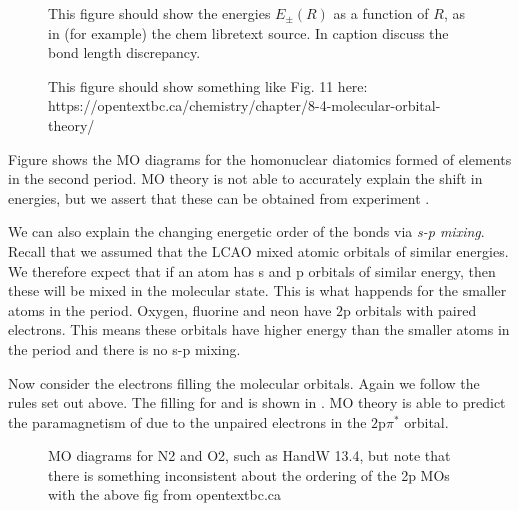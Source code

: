 
\begin{figure}
  \caption{This figure should show the energies $E_\pm(R)$ as a function of $R$,
  as in (for example) the chem libretext source. In caption discuss the bond
  length discrepancy.}
  \label{diaspec:fig:Henergies}
\end{figure}

\begin{figure}
  \caption{This figure should show something like Fig. 11 here:
  https://opentextbc.ca/chemistry/chapter/8-4-molecular-orbital-theory/
  }
  \label{diaspec:fig:2ndperiod}
\end{figure}

Figure  shows the MO diagrams for the
homonuclear diatomics formed of elements in the second period. MO theory is not
able to accurately explain the shift in energies, but we assert that these can
be obtained from experiment .

We can also explain the changing energetic order of the bonds via \emph{s-p
mixing}. Recall that we assumed that the LCAO mixed atomic orbitals of similar
energies. We therefore expect that if an atom has s and p orbitals of similar
energy, then these will be mixed in the molecular state. This is what happends
for the smaller atoms in the period. Oxygen, fluorine and neon have $\text{2p}$
orbitals with paired electrons. This means these orbitals have higher energy
than the smaller atoms in the period and there is no s-p mixing.

Now consider the electrons filling the molecular orbitals. Again we follow the
rules set out above. The filling for  and  is shown in
. MO theory is able to predict the paramagnetism of
 due to the unpaired electrons in the $\text{2p}\pi^*$ orbital.

\begin{figure}
  \caption{MO diagrams for N2 and O2, such as HandW 13.4, but note that there is
  something inconsistent about the ordering of the 2p MOs with the above fig
  from opentextbc.ca
  }
  \label{diaspec:fig:2ndperiod}
\end{figure}


